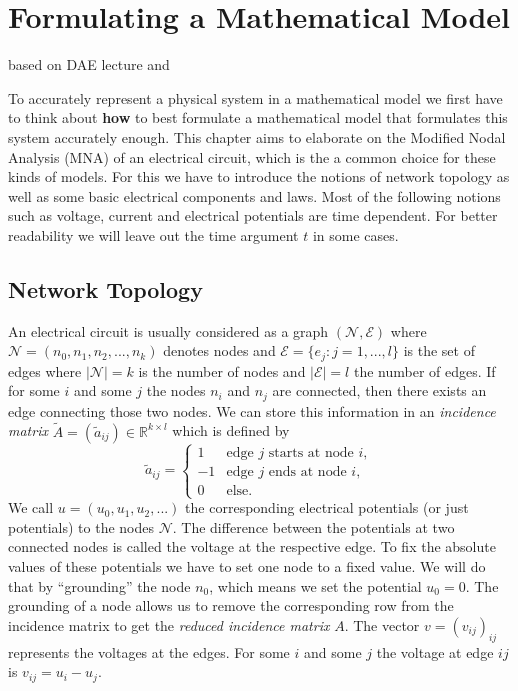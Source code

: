 \chapter{Formulating a Mathematical Model}
based on DAE lecture and \cite{ModellingAndDiscretizationOfCircuitProblems}

To accurately represent a physical system in a mathematical model we first have to think about \textbf{how} to best formulate a mathematical model that formulates this system accurately enough.
This chapter aims to elaborate on the Modified Nodal Analysis (MNA) of an electrical circuit, which is the a common choice for these kinds of models. For this we have to introduce the notions of network topology as well as some basic electrical components and laws. Most of the following notions such as voltage, current and electrical potentials are time dependent. For better readability we will leave out the time argument $t$ in some cases.

\section{Network Topology}
\label{Sec:Network Topology}
An electrical circuit is usually considered as a graph $(\mathcal{N},\mathcal{E})$ where $\mathcal{N} = (n_0, n_1, n_2, ..., n_k)$ denotes nodes and $\mathcal{E} = \{e_{j}: j = 1,...,l\}$ is the set of edges where $|\mathcal{N}| = k$ is the number of nodes and $|\mathcal{E}| = l$ the number of edges. If for some $i$ and some $j$ the nodes $n_i$ and  $n_j$ are connected, then there exists an edge connecting those two nodes.
We can store this information in an \emph{incidence matrix} $\tilde{A} = (\tilde{a}_{ij}) \in \mathbb{R}^{k \times l}$ which is defined by
\begin{displaymath}
	\tilde{a}_{ij} = 
	\begin{cases}
		1 &   \text{edge $j$ starts at node $i$},\\
		-1 &  \text{edge $j$  ends at node $i$},\\
		0 & \text{else}.				
	\end{cases}
\end{displaymath}
We call $u = (u_0, u_1, u_2, ...)$ the corresponding electrical potentials (or just potentials) to the nodes $\mathcal{N}$. The difference between the potentials at two connected nodes is called the voltage at the respective edge. To fix the absolute values of these potentials we have to set one node to a fixed value. We will do that by ``grounding'' the node $n_0$, which means we set the potential $u_0 = 0$. The grounding of a node allows us to remove the corresponding row from the incidence matrix to get the \emph{reduced incidence matrix} $A$. The vector $v = (v_{ij})_{ij}$ represents the voltages at the edges. For some $i$ and some $j$ the voltage at edge $ij$ is $v_{ij} = u_i - u_j$.

